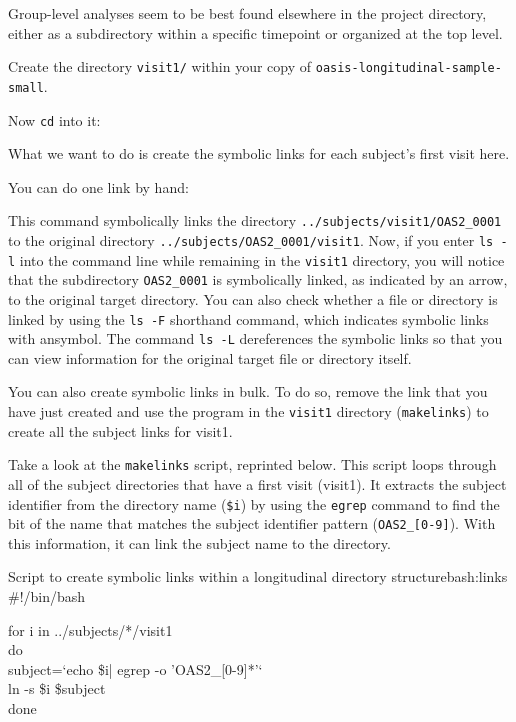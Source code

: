 Group-level analyses seem to be best found elsewhere in the project
directory, either as a subdirectory within a specific timepoint or organized at the top
level.

Create the directory \texttt{visit1/} within your copy of \texttt{oasis-longitudinal-sample-small}. 

Now \texttt{cd} into it:

What we want to do is create the symbolic links for each subject's first visit here. 

You can do one link by hand:

This command symbolically links the directory \texttt{../subjects/visit1/OAS2_0001} to the original directory \texttt{../subjects/OAS2_0001/visit1}. 
Now, if you enter \texttt{ls -l} into the command line while remaining in the \texttt{visit1} directory, you will notice that the subdirectory \texttt{OAS2_0001} is symbolically linked, as indicated by an arrow, to the original target directory. You can also check whether a file or directory is linked by using the \texttt{ls -F} shorthand command, which indicates symbolic links with an\@ symbol. The command \texttt{ls -L} dereferences the symbolic links so that you can view information for the original target file or directory itself.

You can also create symbolic links in bulk. To do so, remove the link that you have just created and
use the program in the \texttt{visit1} directory (\texttt{makelinks}) to create all the subject links for visit1. 

Take a look at the \texttt{makelinks} script, reprinted below. This script loops through all of the subject directories that have a first visit (visit1). It extracts the subject identifier from the directory name (\texttt{\$i}) by using the \texttt{egrep} command to find the bit of the name that matches the subject identifier pattern (\texttt{OAS2_[0-9]}). With this information, it can link the subject name to the directory. 

\begin{bash}{Script to create symbolic links within a longitudinal
    directory structure}{bash:links}
\#!/bin/bash

for i in ../subjects/*/visit1\\
do\\
\tab	subject=`echo \$i| egrep -o 'OAS2_[0-9]*'` \\
\tab	ln -s \$i \$subject\\
done\\
\end{bash}

